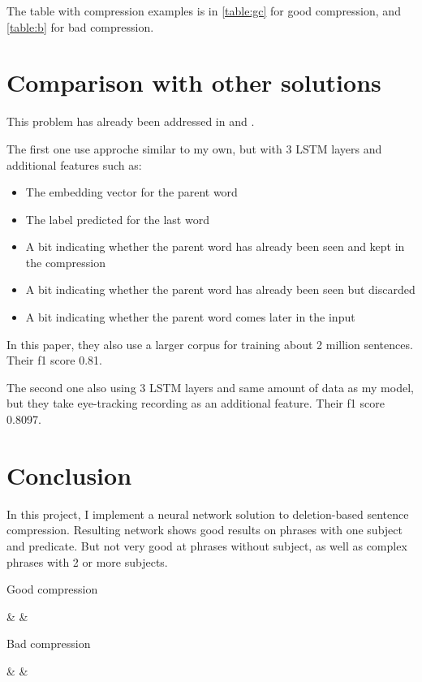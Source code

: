 \documentclass[a4paper,12pt,oneside]{article}
\begin{document}
The table with compression examples is in \cref{table:gc} for good compression, and \cref{table:b} for bad compression.



\section {Comparison with other solutions}
This problem has already been addressed in \cite{lstm} and \cite{gaze_lstm}.

The first one use approche similar to my own, but with 3 LSTM layers and additional features such as:
\begin{itemize}
\item The embedding vector for the parent word
\item The label predicted for the last word
\item A bit indicating whether the parent word has already been seen and kept in the compression
\item A bit indicating whether the parent word has already  been  seen  but  discarded
\item A  bit  indicating  whether  the  parent  word comes later in the input
\end{itemize}
In this paper, they also use a larger corpus for training about 2 million sentences. Their f1 score 0.81.

The second one also using 3 LSTM layers and same amount of data as my model, but they take eye-tracking recording as an additional feature. Their f1 score 0.8097.


\section {Conclusion}
In this project, I implement a neural network solution to deletion-based sentence compression. Resulting network shows good results on phrases with one subject and predicate. But not very good at phrases without subject, as well as complex phrases with 2 or more subjects.




\newpage 

\begin{table}
\centering
\caption{Good compression}
\label{table:gc}
%
{\Phrase & \True & \Predicted \\\midrule}%
\end{table}


\begin{table}
\centering
\caption{Bad compression}
\label{table:b}
%
{\Phrase & \True & \Predicted \\\midrule}%
\end{table}
\end{document}
